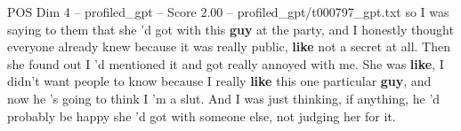 \begin{textsample}{POS Dim 4 – profiled\_gpt – Score 2.00 – profiled\_gpt/t000797\_gpt.txt}  \label{ex:f4_pos_034}
so I was saying to them that she 'd got with this \textbf{guy} at the party, and I honestly thought everyone already knew because it was really public, \textbf{like} not a secret at all.
Then she found out I ’d mentioned it and got really annoyed with me.
She was \textbf{like}, I didn't want people to know because I really \textbf{like} this one particular \textbf{guy}, and now he ’s going to think I ’m a slut.
And I was just thinking, if anything, he ’d probably be happy she ’d got with someone else, not judging her for it.

\end{textsample}
